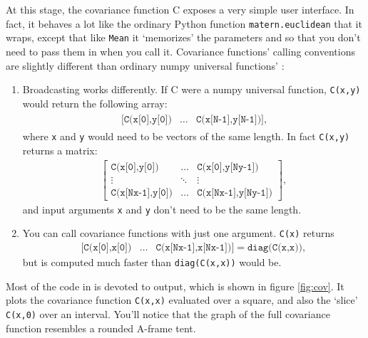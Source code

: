 At this stage, the covariance function C exposes a very simple user interface. In fact, it behaves a lot like the ordinary Python function \texttt{matern.euclidean} that it wraps, except that like \texttt{Mean} it `memorizes' the parameters  and  so that you don't need to pass them in when you call it. Covariance functions' calling conventions are slightly different than ordinary numpy universal functions' \cite{numpybook}:
\begin{enumerate}
    \item Broadcasting works differently. If C were a numpy universal function, \texttt{C(x,y)} would return the following array:
    \begin{eqnarray*}
        \begin{array}{ccc}
            \texttt{[C(x[0],y[0])}& \ldots& \texttt{C(x[N-1],y[N-1])]},
        \end{array}
    \end{eqnarray*}
    where \texttt{x} and \texttt{y} would need to be vectors of the same length. In fact \texttt{C(x,y)} returns a matrix:
    \begin{eqnarray*}
        \left[\begin{array}{ccc}
            \texttt{C(x[0],y[0])}& \ldots& \texttt{C(x[0],y[Ny-1])}\\
            \vdots&\ddots&\vdots\\
            \texttt{C(x[Nx-1],y[0])}& \ldots& \texttt{C(x[Nx-1],y[Ny-1])}
        \end{array}\right],
    \end{eqnarray*}
    and input arguments \texttt{x} and \texttt{y} don't need to be the same length.
    \item You can call covariance functions with just one argument. \texttt{C(x)} returns
    \begin{eqnarray*}
         \texttt{[C(x[0],x[0])}& \ldots& \texttt{C(x[Nx-1],x[Nx-1])]} = \texttt{diag(C(x,x))},
    \end{eqnarray*}
    but is computed much faster than \texttt{diag(C(x,x))} would be.
\end{enumerate}

Most of the code in  is devoted to output, which is shown in figure \ref{fig:cov}. It plots the covariance function \texttt{C(x,x)} evaluated over a square, and also the `slice' \texttt{C(x,0)} over an interval. You'll notice that the graph of the full covariance function resembles a rounded A-frame tent.

